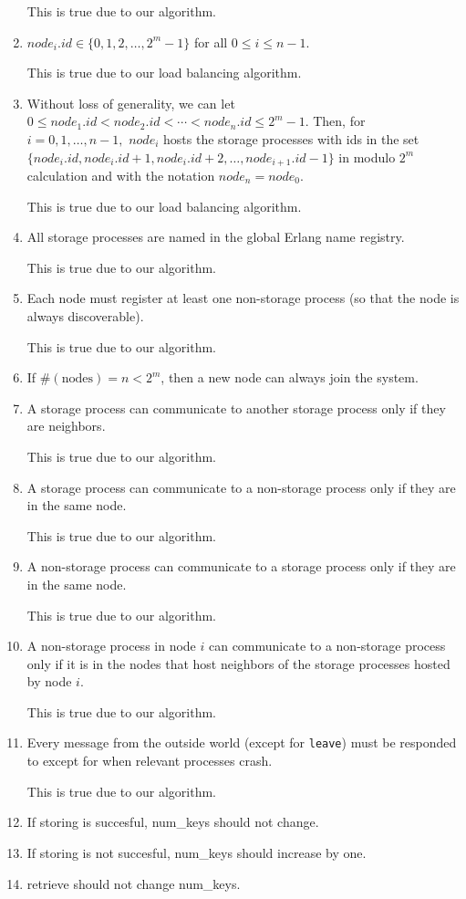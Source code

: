 \documentclass[11pt]{article}
\begin{document}
\begin{enumerate}[S1]
This is true due to our algorithm.
\item $node_i.id \in \{0,1,2,\ldots, 2^m - 1\}$ for all $0\leq i \leq n - 1.$ 

This is true due to our load balancing algorithm.
\item Without loss of generality, we can let
$0 \leq node_1.id < node_2.id < \cdots < node_n.id \leq 2^m - 1.$
Then, for $i= 0, 1, \ldots, n - 1,$ $node_i$ hosts the storage processes with ids in the set $\{node_i.id, node_i.id + 1, node_i.id + 2, \ldots, node_{i+1}.id - 1\}$ in modulo $2^m$ calculation and with the notation $node_{n} = node_0.$

This is true due to our load balancing algorithm.
\item All storage processes are named in the global Erlang name registry.

This is true due to our algorithm.
\item Each node must register at least one non-storage process (so that the node is always discoverable).

This is true due to our algorithm.
\item If $\#(\text{nodes}) = n < 2^m$, then a new node can always join the system.

\item A storage process can communicate to another storage process only if they are neighbors.

This is true due to our algorithm.
\item  A storage process can communicate to a non-storage process only if they are in the same node.

This is true due to our algorithm.
\item A non-storage process can communicate to a storage process only if they are in the same node.

This is true due to our algorithm.
\item  A non-storage process in node $i$ can communicate to a non-storage process only if it is in the nodes that host neighbors of the storage processes hosted by node $i$.

This is true due to our algorithm.
\item Every message from the outside world (except for \texttt{leave}) must be responded to except for when relevant processes crash.

This is true due to our algorithm.

\item If storing is succesful, num\_keys should not change.

\item If storing is not succesful, num\_keys should increase by one.

\item retrieve should not change num\_keys.
\end{enumerate}
\end{document}
